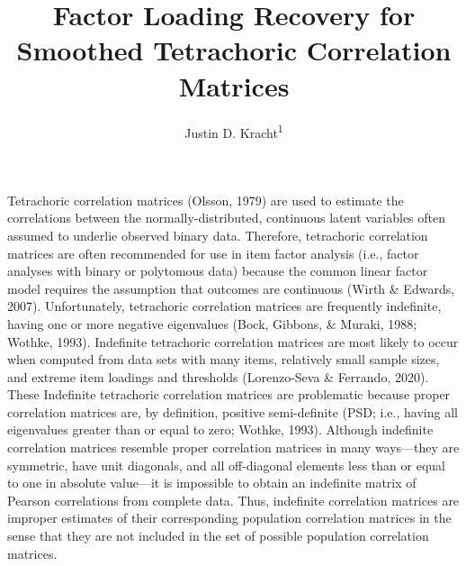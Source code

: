 \documentclass[
  english,
  man]{apa6}
\title{Factor Loading Recovery for Smoothed Tetrachoric Correlation Matrices}
\author{Justin D. Kracht\textsuperscript{1}}
\date{}
\affiliation{\vspace{0.5cm}\textsuperscript{1} University of Minnesota}
\begin{document}
\maketitle

\newcommand{\Rsm}{\mathbf{R}_{\textrm{Sm}}}
\newcommand{\Rpop}{\mathbf{R}_{\textrm{Pop}}}
\newcommand{\Rnpd}{\mathbf{R}_{-}}
\newcommand{\Rapa}{\mathbf{R}_{\textrm{APA}}}
\newcommand{\Rby}{\mathbf{R}_{\textrm{BY}}}
\newcommand{\Rkb}{\mathbf{R}_{\textrm{KB}}}
\newcommand{\dg}{\textrm{dg}}
\newcommand{\Diag}{\textrm{Diag}}
\newcommand{\RMSE}{\textrm{RMSE}(\mathbf{F}, \hat{\mathbf{F}})}
\newcommand{\Ds}{\mathrm{D}_{\mathrm{s}}(\Rsm, \Rpop)}

Tetrachoric correlation matrices (Olsson, 1979) are used to estimate the correlations between the normally-distributed, continuous latent variables often assumed to underlie observed binary data. Therefore, tetrachoric correlation matrices are often recommended for use in item factor analysis (i.e., factor analyses with binary or polytomous data) because the common linear factor model requires the assumption that outcomes are continuous (Wirth \& Edwards, 2007). Unfortunately, tetrachoric correlation matrices are frequently indefinite, having one or more negative eigenvalues (Bock, Gibbons, \& Muraki, 1988; Wothke, 1993). Indefinite tetrachoric correlation matrices are most likely to occur when computed from data sets with many items, relatively small sample sizes, and extreme item loadings and thresholds (Lorenzo-Seva \& Ferrando, 2020). These Indefinite tetrachoric correlation matrices are problematic because proper correlation matrices are, by definition, positive semi-definite (PSD; i.e., having all eigenvalues greater than or equal to zero; Wothke, 1993). Although indefinite correlation matrices resemble proper correlation matrices in many ways---they are symmetric, have unit diagonals, and all off-diagonal elements less than or equal to one in absolute value---it is impossible to obtain an indefinite matrix of Pearson correlations from complete data. Thus, indefinite correlation matrices are improper estimates of their corresponding population correlation matrices in the sense that they are not included in the set of possible population correlation matrices.
\end{document}
